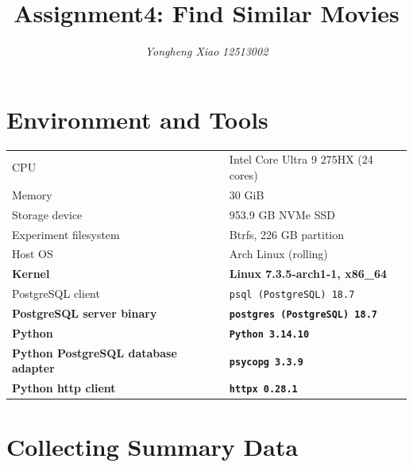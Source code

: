 \documentclass[10pt,a4paper]{article}
\title{Assignment4: Find Similar Movies}
\author{\textit{Yongheng Xiao} \quad \textit{12513002}}
\date{}
\begin{document}
\maketitle

\section{Environment and Tools}

\begin{table}[h]
    \centering
    \small
    \begin{tabular}{@{}ll@{}}
        \toprule
        CPU                                         & Intel Core Ultra 9 275HX (24 cores)                  \\
        Memory                                      & 30 GiB                                               \\
        Storage device                              & 953.9 GB NVMe SSD                                    \\
        Experiment filesystem                       & Btrfs, 226 GB partition                              \\
        Host OS                                     & Arch Linux (rolling)                                 \\
        \textbf{Kernel}                             & \large\textbf{Linux 7.3.5-arch1-1, x86\_64}          \\
        PostgreSQL client                           & \texttt{psql (PostgreSQL) 18.7}                      \\
        \textbf{PostgreSQL server binary}           & {\large\textbf{\texttt{postgres (PostgreSQL) 18.7}}} \\
        \textbf{Python}                             & \large\textbf{\texttt{Python 3.14.10}}               \\
        \textbf{Python PostgreSQL database adapter} & \large\textbf{\texttt{psycopg 3.3.9}}                \\
        \textbf{Python http client}                 & \large\textbf{\texttt{httpx 0.28.1}}                 \\
        \bottomrule
    \end{tabular}
\end{table}

\section{Collecting Summary Data}
\end{document}
